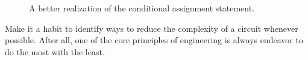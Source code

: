 \begin{figure}[ht]
\caption{A better realization of the conditional assignment statement.}
\label{fig:comboBBcond2}
\end{figure}

Make it a habit to identify ways to reduce the complexity
of a circuit whenever possible.  After all, one of the core
principles of engineering is always endeavor to do the most with 
the least.

